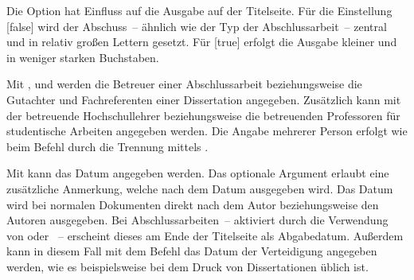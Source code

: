 \begin{Declaration*}{}
\begin{Declaration*}{}
\begin{Declaration*}{}
\begin{Declaration}[v2.02]{}
Die Option  hat Einfluss auf die Ausgabe auf der 
Titelseite. Für die Einstellung [false] wird der 
Abschuss~-- ähnlich wie 
der Typ der Abschlussarbeit~-- zentral und in relativ großen Lettern gesetzt. 
Für [true] erfolgt die Ausgabe kleiner und in weniger 
starken Buchstaben.
\end{Declaration}

\begin{Declaration}{}
\begin{Declaration}{}
\begin{Declaration}{}
\begin{Declaration}{}
\printdeclarationlist%
%
%
%
%
Mit ,  und  werden die Betreuer 
einer Abschlussarbeit beziehungsweise die Gutachter und Fachreferenten einer 
Dissertation angegeben. Zusätzlich kann mit  der betreuende 
Hochschullehrer beziehungsweise die betreuenden Professoren für studentische 
Arbeiten angegeben werden. Die Angabe mehrerer Person erfolgt wie beim Befehl 
 durch die Trennung mittels .
\end{Declaration}
\end{Declaration}
\end{Declaration}
\end{Declaration}

\begin{Declaration}{}
\begin{Declaration}{}
\printdeclarationlist%
%
%
%
%
Mit  kann das Datum angegeben werden. Das optionale Argument 
erlaubt eine zusätzliche Anmerkung, welche nach dem Datum ausgegeben wird. Das 
Datum wird bei normalen Dokumenten direkt nach dem Autor beziehungsweise den 
Autoren ausgegeben. Bei Abschlussarbeiten~-- aktiviert durch die Verwendung von 
 oder ~-- erscheint dieses am Ende der 
Titelseite als Abgabedatum. Außerdem kann in diesem Fall mit dem Befehl
 das Datum der Verteidigung angegeben werden, wie es 
beispielsweise bei dem Druck von Dissertationen üblich ist.


\end{Declaration}
\end{Declaration}
\end{Declaration*}
\end{Declaration*}
\end{Declaration*}
